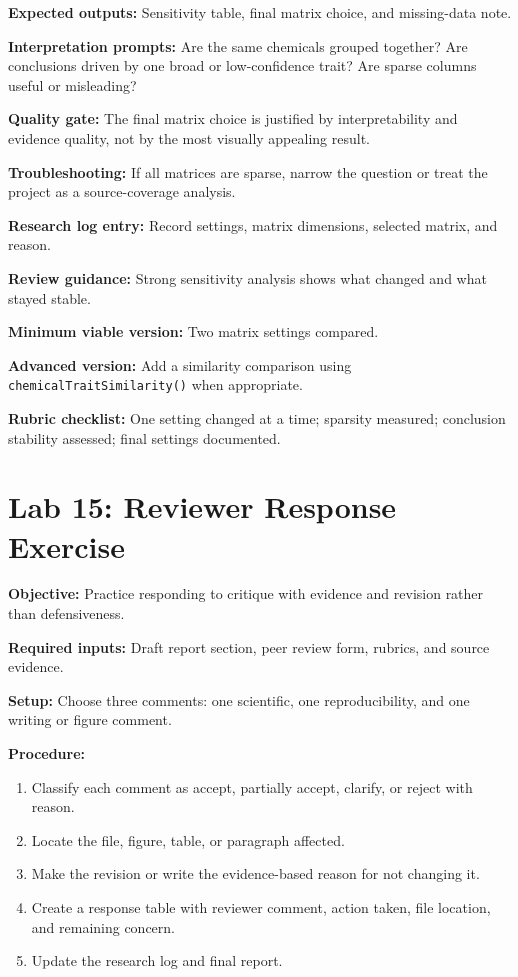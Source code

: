 \textbf{Expected outputs:} Sensitivity table, final matrix choice, and missing-data note.

\textbf{Interpretation prompts:} Are the same chemicals grouped together? Are conclusions driven by one broad or low-confidence trait? Are sparse columns useful or misleading?

\textbf{Quality gate:} The final matrix choice is justified by interpretability and evidence quality, not by the most visually appealing result.

\textbf{Troubleshooting:} If all matrices are sparse, narrow the question or treat the project as a source-coverage analysis.

\textbf{Research log entry:} Record settings, matrix dimensions, selected matrix, and reason.

\textbf{Review guidance:} Strong sensitivity analysis shows what changed and what stayed stable.

\textbf{Minimum viable version:} Two matrix settings compared.

\textbf{Advanced version:} Add a similarity comparison using \texttt{chemicalTraitSimilarity()} when appropriate.

\textbf{Rubric checklist:} One setting changed at a time; sparsity measured; conclusion stability assessed; final settings documented.

\section{Lab 15: Reviewer Response Exercise}
\textbf{Objective:} Practice responding to critique with evidence and revision rather than defensiveness.

\textbf{Required inputs:} Draft report section, peer review form, rubrics, and source evidence.

\textbf{Setup:} Choose three comments: one scientific, one reproducibility, and one writing or figure comment.

\textbf{Procedure:}
\begin{enumerate}
  \item Classify each comment as accept, partially accept, clarify, or reject with reason.
  \item Locate the file, figure, table, or paragraph affected.
  \item Make the revision or write the evidence-based reason for not changing it.
  \item Create a response table with reviewer comment, action taken, file location, and remaining concern.
  \item Update the research log and final report.
\end{enumerate}

